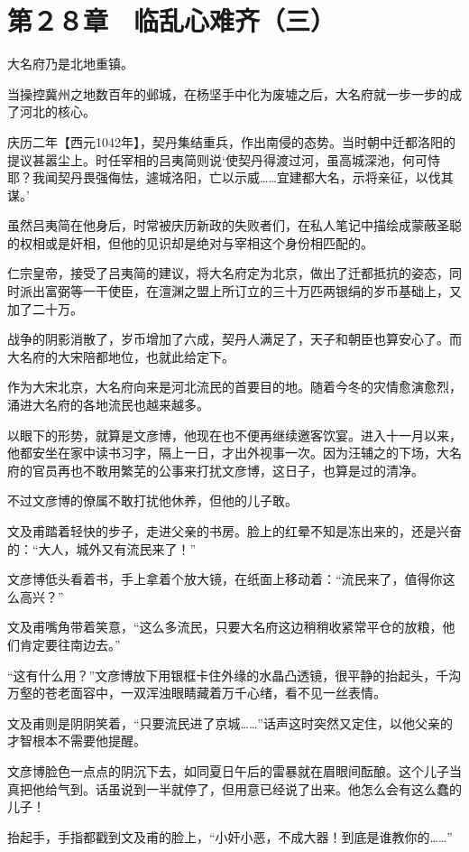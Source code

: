 \section{第２８章　临乱心难齐（三）}

大名府乃是北地重镇。

当操控冀州之地数百年的邺城，在杨坚手中化为废墟之后，大名府就一步一步的成了河北的核心。

庆历二年【西元1042年】，契丹集结重兵，作出南侵的态势。当时朝中迁都洛阳的提议甚嚣尘上。时任宰相的吕夷简则说‘使契丹得渡过河，虽高城深池，何可恃耶？我闻契丹畏强侮怯，遽城洛阳，亡以示威……宜建都大名，示将亲征，以伐其谋。’

虽然吕夷简在他身后，时常被庆历新政的失败者们，在私人笔记中描绘成蒙蔽圣聪的权相或是奸相，但他的见识却是绝对与宰相这个身份相匹配的。

仁宗皇帝，接受了吕夷简的建议，将大名府定为北京，做出了迁都抵抗的姿态，同时派出富弼等一干使臣，在澶渊之盟上所订立的三十万匹两银绢的岁币基础上，又加了二十万。

战争的阴影消散了，岁币增加了六成，契丹人满足了，天子和朝臣也算安心了。而大名府的大宋陪都地位，也就此给定下。

作为大宋北京，大名府向来是河北流民的首要目的地。随着今冬的灾情愈演愈烈，涌进大名府的各地流民也越来越多。

以眼下的形势，就算是文彦博，他现在也不便再继续邀客饮宴。进入十一月以来，他都安坐在家中读书习字，隔上一日，才出外视事一次。因为汪辅之的下场，大名府的官员再也不敢用繁芜的公事来打扰文彦博，这日子，也算是过的清净。

不过文彦博的僚属不敢打扰他休养，但他的儿子敢。

文及甫踏着轻快的步子，走进父亲的书房。脸上的红晕不知是冻出来的，还是兴奋的：“大人，城外又有流民来了！”

文彦博低头看着书，手上拿着个放大镜，在纸面上移动着：“流民来了，值得你这么高兴？”

文及甫嘴角带着笑意，“这么多流民，只要大名府这边稍稍收紧常平仓的放粮，他们肯定要往南边去。”

“这有什么用？”文彦博放下用银框卡住外缘的水晶凸透镜，很平静的抬起头，千沟万壑的苍老面容中，一双浑浊眼睛藏着万千心绪，看不见一丝表情。

文及甫则是阴阴笑着，“只要流民进了京城……”话声这时突然又定住，以他父亲的才智根本不需要他提醒。

文彦博脸色一点点的阴沉下去，如同夏日午后的雷暴就在眉眼间酝酿。这个儿子当真把他给气到。话虽说到一半就停了，但用意已经说了出来。他怎么会有这么蠢的儿子！

抬起手，手指都戳到文及甫的脸上，“小奸小恶，不成大器！到底是谁教你的……”

